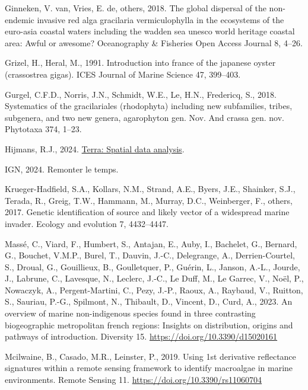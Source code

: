 \documentclass[
  letterpaper,
  DIV=11,
  numbers=noendperiod]{scrartcl}
\newlength{\cslhangindent}
\newenvironment{CSLReferences}[2] %
 {\begin{list}{}{%
  \setlength{\itemindent}{0pt}
  \setlength{\leftmargin}{0pt}
  \setlength{\parsep}{0pt}
  \ifodd #1
   \setlength{\leftmargin}{\cslhangindent}
   \setlength{\itemindent}{-1\cslhangindent}
  \fi
  \setlength{\itemsep}{#2\baselineskip}}}
 {\end{list}}
\begin{document}
\begin{CSLReferences}{1}{0}
Ginneken, V. van, Vries, E. de, others, 2018. The global dispersal of
the non-endemic invasive red alga gracilaria vermiculophylla in the
ecosystems of the euro-asia coastal waters including the wadden sea
unesco world heritage coastal area: Awful or awesome? Oceanography \&
Fisheries Open Access Journal 8, 4--26.

Grizel, H., Heral, M., 1991. Introduction into france of the japanese
oyster (crassostrea gigas). ICES Journal of Marine Science 47, 399--403.

Gurgel, C.F.D., Norris, J.N., Schmidt, W.E., Le, H.N., Fredericq, S.,
2018. Systematics of the gracilariales (rhodophyta) including new
subfamilies, tribes, subgenera, and two new genera, agarophyton gen.
Nov. And crassa gen. nov. Phytotaxa 374, 1--23.

Hijmans, R.J., 2024.
\href{https://CRAN.R-project.org/package=terra}{Terra: Spatial data
analysis}.

IGN, 2024. Remonter le temps.

Krueger-Hadfield, S.A., Kollars, N.M., Strand, A.E., Byers, J.E.,
Shainker, S.J., Terada, R., Greig, T.W., Hammann, M., Murray, D.C.,
Weinberger, F., others, 2017. Genetic identification of source and
likely vector of a widespread marine invader. Ecology and evolution 7,
4432--4447.

Massé, C., Viard, F., Humbert, S., Antajan, E., Auby, I., Bachelet, G.,
Bernard, G., Bouchet, V.M.P., Burel, T., Dauvin, J.-C., Delegrange, A.,
Derrien-Courtel, S., Droual, G., Gouillieux, B., Goulletquer, P.,
Guérin, L., Janson, A.-L., Jourde, J., Labrune, C., Lavesque, N.,
Leclerc, J.-C., Le Duff, M., Le Garrec, V., Noël, P., Nowaczyk, A.,
Pergent-Martini, C., Pezy, J.-P., Raoux, A., Raybaud, V., Ruitton, S.,
Sauriau, P.-G., Spilmont, N., Thibault, D., Vincent, D., Curd, A., 2023.
An overview of marine non-indigenous species found in three contrasting
biogeographic metropolitan french regions: Insights on distribution,
origins and pathways of introduction. Diversity 15.
\url{https://doi.org/10.3390/d15020161}

Mcilwaine, B., Casado, M.R., Leinster, P., 2019. Using 1st derivative
reflectance signatures within a remote sensing framework to identify
macroalgae in marine environments. Remote Sensing 11.
\url{https://doi.org/10.3390/rs11060704}


\end{CSLReferences}
\end{document}
